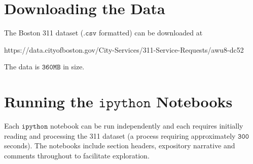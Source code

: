 \documentclass{article}
\theoremstyle{theorem}
\theoremstyle{theorem}
\theoremstyle{theorem}
\theoremstyle{lemma}
\theoremstyle{definition}
\theoremstyle{example}
\begin{document}
\section{Downloading the Data}
The Boston 311 dataset ($\texttt{.csv}$ formatted) can be downloaded at
\begin{center}
https://data.cityofboston.gov/City-Services/311-Service-Requests/awu8-dc52
\end{center}
The data is $\mathtt{360MB}$ in size.
\section{Running the $\texttt{ipython}$ Notebooks}
Each $\texttt{ipython}$ notebook can be run independently and each requires initially reading and processing the 311 dataset (a process requiring approximately $\mathtt{300}$ seconds). The notebooks include section headers, expository narrative and comments throughout to facilitate exploration. 
\end{document}
